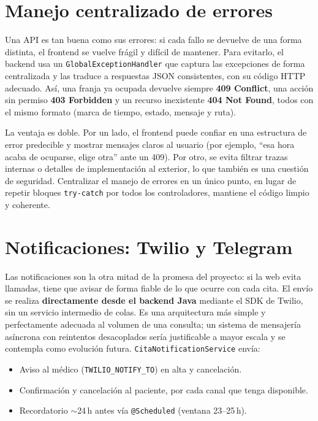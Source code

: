 \documentclass[12pt,a4paper]{report}
\begin{document}
\section{Manejo centralizado de errores}

Una API es tan buena como sus errores: si cada fallo se devuelve de una forma distinta, el frontend se vuelve frágil y difícil de mantener. Para evitarlo, el backend usa un \texttt{GlobalExceptionHandler} que captura las excepciones de forma centralizada y las traduce a respuestas JSON consistentes, con su código HTTP adecuado. Así, una franja ya ocupada devuelve siempre \textbf{409 Conflict}, una acción sin permiso \textbf{403 Forbidden} y un recurso inexistente \textbf{404 Not Found}, todos con el mismo formato (marca de tiempo, estado, mensaje y ruta).

La ventaja es doble. Por un lado, el frontend puede confiar en una estructura de error predecible y mostrar mensajes claros al usuario (por ejemplo, ``esa hora acaba de ocuparse, elige otra'' ante un 409). Por otro, se evita filtrar trazas internas o detalles de implementación al exterior, lo que también es una cuestión de seguridad. Centralizar el manejo de errores en un único punto, en lugar de repetir bloques \texttt{try-catch} por todos los controladores, mantiene el código limpio y coherente.

\section{Notificaciones: Twilio y Telegram}

Las notificaciones son la otra mitad de la promesa del proyecto: si la web evita llamadas, tiene que avisar de forma fiable de lo que ocurre con cada cita. El envío se realiza \textbf{directamente desde el backend Java} mediante el SDK de Twilio, sin un servicio intermedio de colas. Es una arquitectura más simple y perfectamente adecuada al volumen de una consulta; un sistema de mensajería asíncrona con reintentos desacoplados sería justificable a mayor escala y se contempla como evolución futura. \texttt{CitaNotificationService} envía:
\begin{itemize}
  \item Aviso al médico (\texttt{TWILIO\_NOTIFY\_TO}) en alta y cancelación.
  \item Confirmación y cancelación al paciente, por cada canal que tenga disponible.
  \item Recordatorio $\sim$24\,h antes vía \texttt{@Scheduled} (ventana 23--25\,h).
\end{itemize}
\end{document}
